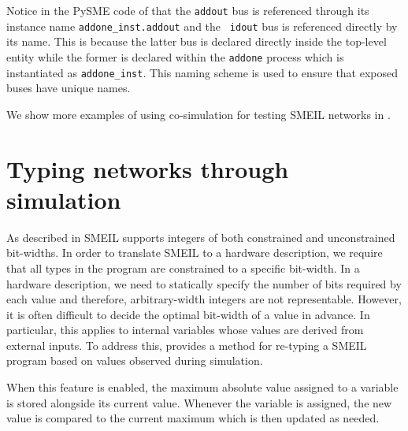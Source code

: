 Notice in the PySME code of  that the {\tt addout} bus is
referenced through its instance name {\tt addone_inst.addout} and the {\tt
  idout} bus is referenced directly by its name. This is because the latter bus
is declared directly inside the top-level entity while the former is declared
within the {\tt addone} process which is instantiated as {\tt addone_inst}.
This naming scheme is used to ensure that exposed buses have unique names.

We show more examples of using co-simulation for testing SMEIL networks in
.



\section{Typing networks through simulation}
\label{sec:typing}
As described in  SMEIL supports integers of both constrained
and unconstrained bit-widths.  In order to translate SMEIL to a hardware
description, we require that all types in the program are constrained to a
specific bit-width.  In a hardware description, we need to statically specify
the number of bits required by each value and therefore, arbitrary-width
integers are not representable.  However, it is often difficult to decide the
optimal bit-width of a value in advance. In particular, this applies to internal
variables whose values are derived from external inputs. To address this,
\libsme{} provides a method for re-typing a SMEIL program based on values
observed during simulation.

When this feature is enabled, the maximum absolute value assigned to a variable
is stored alongside its current value. Whenever the variable is assigned, the
new value is compared to the current maximum which is then updated as needed.


